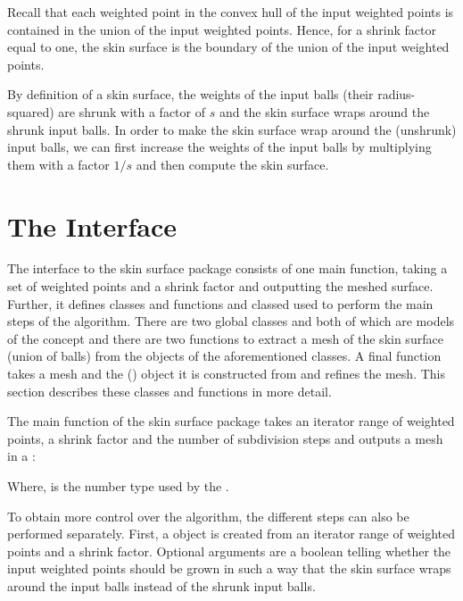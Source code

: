 Recall that each weighted point in the convex hull of the input
weighted points is contained in the union of the input weighted
points. Hence, for a shrink factor equal to one, the skin surface is
the boundary of the union of the input weighted points.

By definition of a skin surface, the weights of the input balls (their
radius-squared) are shrunk with a factor of $s$ and the skin surface
wraps around the shrunk input balls. In order to make the skin surface
wrap around the (unshrunk) input balls, we can first increase the
weights of the input balls by multiplying them with a factor $1/s$ and
then compute the skin surface.

\section{The Interface}
\ccThreeToTwo

The interface to the skin surface package consists of one main
function, taking a set of weighted points and a shrink factor and
outputting the meshed surface. Further, it defines classes and
functions and classed used to perform the main steps of the algorithm.
There are two global classes  and
 both of which are models of the concept
 and there are two functions to extract a mesh of
the skin surface (union of balls) from the objects of the
aforementioned classes. A final function takes a mesh and the
 () object it is constructed
from and refines the mesh. This section describes these classes and
functions in more detail.

The main function of the skin surface package takes an iterator range
of weighted points, a shrink factor and the number of subdivision
steps and outputs a mesh in a :


Where,  is the number type used by the .

To obtain more control over the algorithm, the different steps can
also be performed separately. First, a  object is
created from an iterator range of weighted points and a shrink factor.
Optional arguments are a boolean telling whether the input weighted
points should be grown in such a way that the skin surface wraps
around the input balls instead of the shrunk input balls.

